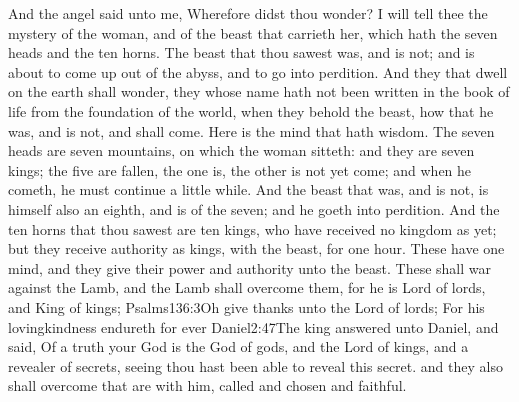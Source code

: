 And the angel said unto me, Wherefore didst thou wonder? I will tell thee the mystery of the woman, and of the beast that carrieth her, which hath the seven heads and the ten horns. 
The beast that thou sawest was, and is not; and is about to come up out of the abyss, and to go into perdition. And they that dwell on the earth shall wonder, they whose name hath not been written in the book of life from the foundation of the world, when they behold the beast, how that he was, and is not, and shall come. 
Here is the mind that hath wisdom. The seven heads are seven mountains, on which the woman sitteth: 
and they are seven kings; the five are fallen, the one is, the other is not yet come; and when he cometh, he must continue a little while. 
And the beast that was, and is not, is himself also an eighth, and is of the seven; and he goeth into perdition. 
And the ten horns that thou sawest are ten kings,%
who have received no kingdom as yet; but they receive authority as kings, with the beast, for one hour. 
These have one mind, and they give their power and authority unto the beast. 
These shall war against the Lamb, and the Lamb shall overcome them, for he is Lord of lords, and King of kings;%
				  {Psalms}{136:3}{Oh give thanks unto the Lord of lords; For his lovingkindness endureth for ever}%
				   {Daniel}{2:47}{The king answered unto Daniel, and said, Of a truth your God is the God of gods, and the Lord of kings, and a revealer of secrets, seeing thou hast been able to reveal this secret.} %
and they also shall overcome that are with him, called and chosen and faithful. 

